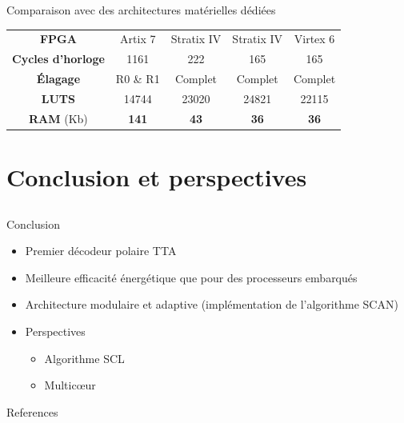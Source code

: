 \begin{frame}[c]{Comparaison avec des architectures matérielles dédiées}
{\begin{table}
{{\begin{tabular}{c|c|c|c|c}
          \textbf{FPGA}         &  Artix 7       & Stratix IV            & Stratix IV         & Virtex 6             \\
          \textbf{Cycles d'horloge}   &  1161          & 222                   & 165                & 165                  \\
          \textbf{\'Elagage}        &  R0 \& R1      & Complet                  & Complet               & Complet                  \\
          \textbf{LUTS}           &  14744         & 23020                 & 24821              & 22115                \\
          \textbf{RAM} (Kb)       &  \textbf{141}  & \textbf{43}           & \textbf{36}        & \textbf{36}          \\


        \end{tabular}
      }}
      \end{table}
    }
\end{frame}

\section{Conclusion et perspectives}
\subsection*{}

\begin{frame}[c]{Conclusion}

  \begin{itemize}
    \item<+-> Premier décodeur polaire TTA
    \vspace{0.3cm}
    \item<+-> Meilleure efficacité énergétique que pour des processeurs embarqués
    \vspace{0.3cm}
    \item<+-> Architecture modulaire et adaptive (implémentation de l'algorithme SCAN)
    \vspace{0.3cm}
    \item<+-> Perspectives
    \begin{itemize}
      \item<+-> Algorithme SCL
      \item<+-> Multicœur
    \end{itemize}
  \end{itemize}

\end{frame}

\begin{frame}[allowframebreaks]{References}
\printbibliography
\end{frame}
